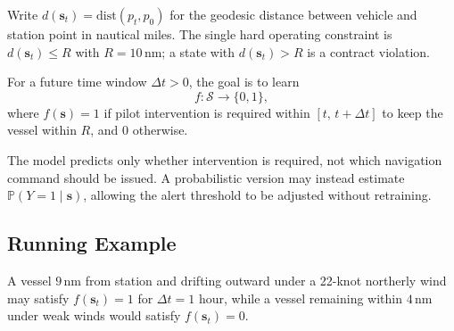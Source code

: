\documentclass[sigconf]{acmart}
\begin{document}
Write $d(\mathbf{s}_t)=\mathrm{dist}(p_t,p_0)$ for the geodesic distance between
vehicle and station point in nautical miles. The single hard operating
constraint is $d(\mathbf{s}_t) \le R$ with $R = 10$\,nm; a state with
$d(\mathbf{s}_t) > R$ is a contract violation.

For a future time window $\Delta t > 0$, the goal is to learn
\begin{equation}
  f: \mathcal{S} \rightarrow \{0,1\},
\end{equation}
where $f(\mathbf{s}) = 1$ if pilot intervention is required within
$[t,\,t+\Delta t]$ to keep the vessel within $R$, and $0$ otherwise.

The model predicts only whether intervention is required, not which
navigation command should be issued. A probabilistic version may instead estimate
$\mathbb{P}(Y=1\mid\mathbf{s})$, allowing the alert threshold to be adjusted
without retraining.

\subsection{Running Example}

A vessel $9$\,nm from station and drifting outward under a
22-knot northerly wind may satisfy $f(\mathbf{s}_t)=1$ for
$\Delta t=1$ hour, while a vessel remaining within $4$\,nm under weak winds
would satisfy $f(\mathbf{s}_t)=0$.



\end{document}
